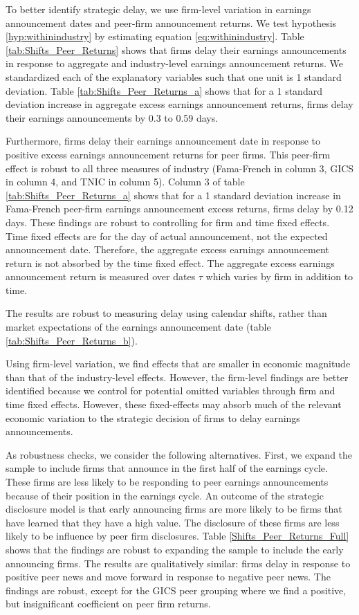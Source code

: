 \documentclass[authoryear,letterpaper,english,12pt]{elsarticle}
\begin{document}
To better identify strategic delay, we use firm-level variation in earnings announcement dates and peer-firm announcement returns. We test hypothesis \ref{hyp:withinindustry} by estimating equation \ref{eq:withinindustry}. Table \ref{tab:Shifts_Peer_Returns} shows that firms delay their earnings announcements in response to aggregate and industry-level earnings announcement returns. We standardized each of the explanatory variables such that one unit is 1 standard deviation.  Table \ref{tab:Shifts_Peer_Returns_a} shows that for a 1 standard deviation increase in aggregate excess earnings announcement returns, firms delay their earnings announcements by 0.3 to 0.59 days. 

Furthermore, firms delay their earnings announcement date in response to positive excess earnings announcement returns for peer firms. This peer-firm effect is robust to all three measures of industry (Fama-French in column 3, GICS in column 4, and TNIC in column 5). Column 3 of table \ref{tab:Shifts_Peer_Returns_a} shows that for a 1 standard deviation increase in Fama-French peer-firm earnings announcement excess returns, firms delay by 0.12 days. These findings are robust to controlling for firm and time fixed effects. Time fixed effects are for the day of actual announcement, not the expected announcement date. Therefore, the aggregate excess earnings announcement return is not absorbed by the time fixed effect. The aggregate excess earnings announcement return is measured over dates $\tau$ which varies by firm in addition to time. 

The results are robust to measuring delay using calendar shifts, rather than market expectations of the earnings announcement date (table \ref{tab:Shifts_Peer_Returns_b}). 

Using firm-level variation, we find effects that are smaller in economic magnitude than that of the industry-level effects. However, the firm-level findings are better identified because we control for potential omitted variables through firm and time fixed effects. However, these fixed-effects may absorb much of the relevant economic variation to the strategic decision of firms to delay earnings announcements. 

As robustness checks, we consider the following alternatives. First, we expand the sample to include firms that announce in the first half of the earnings cycle. These firms are less likely to be responding to peer earnings announcements because of their position in the earnings cycle. An outcome of the strategic disclosure model is that early announcing firms are more likely to be firms that have learned that they have a high value. The disclosure of these firms are less likely to be influence by peer firm disclosures. Table \ref{Shifts_Peer_Returns_Full} shows that the findings are robust to expanding the sample to include the early announcing firms. The results are qualitatively similar: firms delay in response to positive peer news and move forward in response to negative peer news. The findings are robust, except for the GICS peer grouping where we find a positive, but insignificant coefficient on peer firm returns. 
\end{document}
